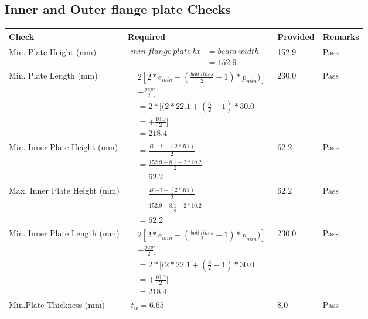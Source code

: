 \documentclass{article}%
\begin{document}
\subsection{Inner and Outer flange plate Checks}%
\label{subsec:InnerandOuterflangeplateChecks}%
\renewcommand{\arraystretch}{1.2}%
\begin{longtable}{|p{4cm}|p{6cm}|p{5.5cm}|p{1.5cm}|}%
\hline%
\rowcolor{OsdagGreen}%
Check&Required&Provided&Remarks\\%
\hline%
\endhead%
\hline%
Min. Plate Height (mm)&$\begin{aligned}min~flange~plate~ht &= beam~width\\ &=152.9\end{aligned}$&152.9&Pass\\%
\hline%
Min. Plate Length (mm)&$\begin{aligned} & 2[2*e_{min} + ({\frac{bolt~lines}{2}}-1) * p_{min})]\\ & +\frac{gap}{2}]\\ &=2*[(2*22.1 + (\frac{6}{2}-1) * 30.0\\ &= + \frac{10.0}{2}]\\ &=218.4\end{aligned}$&230.0&Pass\\%
\hline%
Min. Inner Plate Height (mm)&$\begin{aligned}&= \frac{B -t- (2*R1)}{2}\\ &=\frac{152.9 -8.1 - 2*10.2}{2}\\ &=62.2\end{aligned}$&62.2&Pass\\%
\hline%
Max. Inner Plate Height (mm)&$\begin{aligned}&= \frac{B -t- (2*R1)}{2}\\ &=\frac{152.9 -8.1 - 2*10.2}{2}\\ &=62.2\end{aligned}$&62.2&Pass\\%
\hline%
Min. Inner Plate Length (mm)&$\begin{aligned} & 2[2*e_{min} + ({\frac{bolt~lines}{2}}-1) * p_{min})]\\ & +\frac{gap}{2}]\\ &=2*[(2*22.1 + (\frac{6}{2}-1) * 30.0\\ &= + \frac{10.0}{2}]\\ &=218.4\end{aligned}$&230.0&Pass\\%
\hline%
Min.Plate Thickness (mm)&$\begin{aligned} t_w=6.65\end{aligned}$&8.0&Pass\\%
\hline%
\end{longtable}
\end{document}
